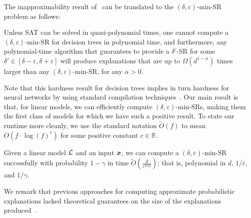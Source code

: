 The inapproximability result of~\citet{Kozachinskiy_2023} can be translated to the $(\delta, \varepsilon)$-min-SR problem as follows:
\begin{theorem}
    Unless SAT can be solved in quasi-polynomial times, one cannot compute a $(\delta, \varepsilon)$-min-SR for decision trees in polynomial time, and furthermore, any polynomial-time algorithm that guarantees to provide a $\delta'$-SR for some $\delta' \in [\delta-\varepsilon, \delta+\varepsilon]$ will produce explanations that are up to $\Omega(d^{1-\alpha})$ times larger than any $(\delta, \varepsilon)$-min-SR, for any $\alpha > 0$.
\end{theorem}
Note that this hardness result for decision trees implies in turn hardness for neural networks by using standard compilation techniques~\citep{NEURIPS2020_b1adda14}.
Our main result is that, for linear models, we can efficiently compute $(\delta, \varepsilon)$-min-SRs, making them the first class of models for which we have such a positive result. To state our runtime more cleanly, we use the standard notation $\widetilde{O}(f)$ to mean $O(f \cdot \log(f)^c)$ for some positive constant $c \in \mathbb{R}$. 
\begin{theorem}
    \label{prop:smoothed-explanation}
    Given a linear model $\mathcal{L}$ and an input ${\bm{x}}$, we can compute a $(\delta, \varepsilon)$-min-SR successfully with probability $1 - \gamma$ in time $\widetilde{O}\left( \frac{d}{\varepsilon^2\gamma^2}\right)$; that is, polynomial in $d$, $1/\varepsilon$, and $1/\gamma$.
\end{theorem}

We remark that previous approaches for computing approximate probabilistic explanations lacked theoretical guarantees on the size of the explanations produced~\citep{izzaComputingProbabilisticAbductive2023,Izza2021EfficientEW,izza2024locallyminimalprobabilisticexplanations}.




